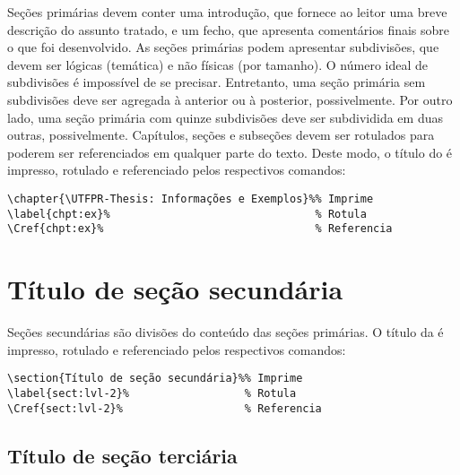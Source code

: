 Seções primárias devem conter uma introdução, que fornece ao leitor uma breve descrição do assunto tratado, e um fecho, que apresenta comentários finais sobre o que foi desenvolvido.
As seções primárias podem apresentar subdivisões, que devem ser lógicas (temática) e não físicas (por tamanho).
O número ideal de subdivisões é impossível de se precisar.
Entretanto, uma seção primária sem subdivisões deve ser agregada à anterior ou à posterior, possivelmente.
Por outro lado, uma seção primária com quinze subdivisões deve ser subdividida em duas outras, possivelmente.
Capítulos\label{err:chpt-2}, seções e subseções\label{err:ssect} devem ser rotulados para poderem ser referenciados em qualquer parte do texto.
Deste modo, o título do  é impresso, rotulado e referenciado pelos respectivos comandos:

\begin{snugshade}
\begin{Verbatim}
\chapter{\UTFPR-Thesis: Informações e Exemplos}%% Imprime
\label{chpt:ex}%                                % Rotula
\Cref{chpt:ex}%                                 % Referencia
\end{Verbatim}
\end{snugshade}

\section{Título de seção secundária}%
\label{sect:lvl-2}

Seções secundárias são divisões do conteúdo das seções primárias.
O título da  é impresso, rotulado e referenciado pelos respectivos comandos:

\begin{snugshade}
\begin{Verbatim}
\section{Título de seção secundária}%% Imprime
\label{sect:lvl-2}%                  % Rotula
\Cref{sect:lvl-2}%                   % Referencia
\end{Verbatim}
\end{snugshade}

\subsection{Título de seção terciária}%
\label{ssect:lvl-3}

